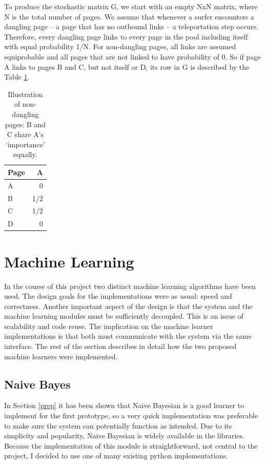 \documentclass[11pt,twoside,notitlepage]{report}
\begin{document}
To produce the stochastic matrix G, we start with an empty NxN matrix, where N
is the total number of pages. We assume that whenever a surfer encounters a
dangling page -- a page that has no outbound links -- a teleportation step
occurs. Therefore, every dangling page links to every page in the pool
including itself with equal probability 1/N. For non-dangling pages, all links
are assumed equiprobable and all pages that are not linked to have probability
of 0. So if page A links to pages B and C, but not itself or D, its row in G is
described by the Table \ref{tab}.

\begin{table}
    \begin{center}
      \begin{tabular}{|l|r|}
        \hline
        Page & A \\ \hline
         A &  0  \\ \hline
         B & 1/2 \\ \hline
         C & 1/2 \\ \hline
         D & 0   \\ \hline
      \end{tabular}
      \caption{Illustration of non-dangling pages: B and C share A's `importance' equally.\label{tab}}
  \end{center}
\end{table}

\section{Machine Learning}
In the course of this project two distinct machine learning algorithms have
been used. The design goals for the implementations were as usual: speed and
correctness. Another important aspect of the design is that the system and the
machine learning modules must be sufficiently decoupled. This is an issue of
scalability and code reuse. The implication on the machine learner
implementations is that both must communicate with the system via the same
interface. The rest of the section describes in detail how the two proposed
machine learners were implemented.

\subsection{Naive Bayes}
In Section \ref{prep} it has been shown that Naive Bayesian is a good learner
to implement for the first prototype, so a very quick implementation was
preferable to make sure the system can potentially function as intended. Due to
its simplicity and popularity, Naive Bayesian is widely available in the
libraries. Because the implementation of this module is straightforward, not
central to the project, I decided to use one of many existing python
implementations. 
\end{document}
